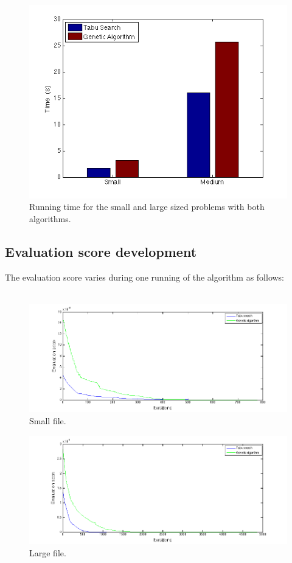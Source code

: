 \documentclass[titlepage,a4paper]{article}
\begin{document}
\begin{figure}[H]
  \centering
    \includegraphics[scale=0.5]{../results/figures/time_bar_graph.png}
  \caption{Running time for the small and large sized problems with both algorithms.}
  \label{time_bar_graph}
\end{figure}

\subsection{Evaluation score development}
The evaluation score varies during one running of the algorithm as follows: \\\\
\begin{figure}[H]
  \centerline{\includegraphics[scale=0.5]{../results/figures/plot_small.png}}
  \caption{Small file.}
  \label{plot_small}
\end{figure}

\begin{figure}[H]
  \centerline{\includegraphics[scale=0.5]{../results/figures/plot_medium.png}}
  \caption{Large file.}
  \label{plot_large}
\end{figure}
\end{document}
